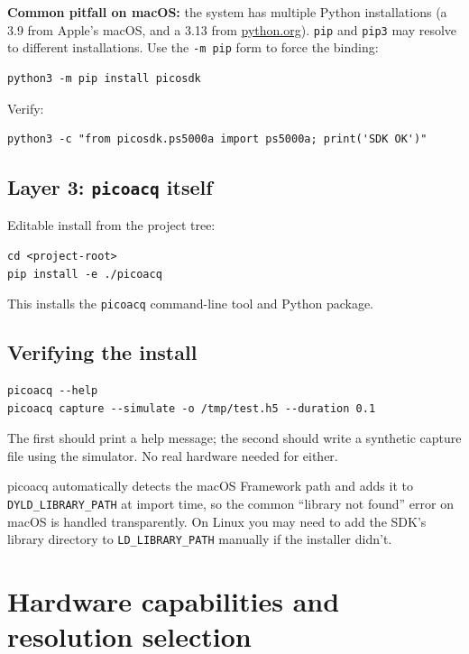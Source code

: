 \documentclass[11pt]{article}
\begin{document}
\textbf{Common pitfall on macOS:} the system has multiple Python
installations (a 3.9 from Apple's macOS, and a 3.13 from
\url{python.org}).  \texttt{pip} and \texttt{pip3} may resolve to
different installations.  Use the \texttt{-m pip} form to force the
binding:

\begin{lstlisting}[style=shell]
python3 -m pip install picosdk
\end{lstlisting}

Verify:
\begin{lstlisting}[style=shell]
python3 -c "from picosdk.ps5000a import ps5000a; print('SDK OK')"
\end{lstlisting}

\subsection{Layer 3: \texttt{picoacq} itself}

Editable install from the project tree:

\begin{lstlisting}[style=shell]
cd <project-root>
pip install -e ./picoacq
\end{lstlisting}

This installs the \texttt{picoacq} command-line tool and Python
package.

\subsection{Verifying the install}

\begin{lstlisting}[style=shell]
picoacq --help
picoacq capture --simulate -o /tmp/test.h5 --duration 0.1
\end{lstlisting}

The first should print a help message; the second should write a
synthetic capture file using the simulator.  No real hardware needed
for either.

\textsf{picoacq} automatically detects the macOS Framework path and
adds it to \texttt{DYLD\_LIBRARY\_PATH} at import time, so the
common ``library not found'' error on macOS is handled transparently.
On Linux you may need to add the SDK's library directory to
\texttt{LD\_LIBRARY\_PATH} manually if the installer didn't.

\section{Hardware capabilities and resolution selection}
\label{sec:resolution}
\end{document}
